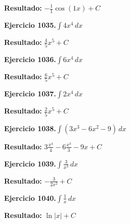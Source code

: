 \documentclass[10pt,a4paper]{article}
\begin{document}
\begin{solbox}
\textbf{Resultado:} \(\displaystyle -\frac{1}{1}\cos(1x) + C\)
\end{solbox}

\begin{ejbox}
\textbf{Ejercicio 1035.}\quad $\int 4x^{4}\,dx$
\end{ejbox}

\begin{solbox}
\textbf{Resultado:} \(\displaystyle \frac{4}{5}x^{5} + C\)
\end{solbox}

\newpage
\begin{ejbox}
\textbf{Ejercicio 1036.}\quad $\int 6x^{4}\,dx$
\end{ejbox}

\begin{solbox}
\textbf{Resultado:} \(\displaystyle \frac{6}{5}x^{5} + C\)
\end{solbox}

\begin{ejbox}
\textbf{Ejercicio 1037.}\quad $\int 2x^{4}\,dx$
\end{ejbox}

\begin{solbox}
\textbf{Resultado:} \(\displaystyle \frac{2}{5}x^{5} + C\)
\end{solbox}

\begin{ejbox}
\textbf{Ejercicio 1038.}\quad $\int (3x^3 -6x^2 -9)\,dx$
\end{ejbox}

\begin{solbox}
\textbf{Resultado:} \(\displaystyle 3\frac{x^4}{4} -6\frac{x^3}{3} -9x + C\)
\end{solbox}

\newpage
\begin{ejbox}
\textbf{Ejercicio 1039.}\quad $\int \frac{3}{x^{3}}\,dx$
\end{ejbox}

\begin{solbox}
\textbf{Resultado:} \(\displaystyle -\frac{3}{2x^{2}} + C\)
\end{solbox}

\begin{ejbox}
\textbf{Ejercicio 1040.}\quad $\int \frac{1}{x}\,dx$
\end{ejbox}

\begin{solbox}
\textbf{Resultado:} \(\displaystyle \ln|x| + C\)
\end{solbox}
\end{document}
